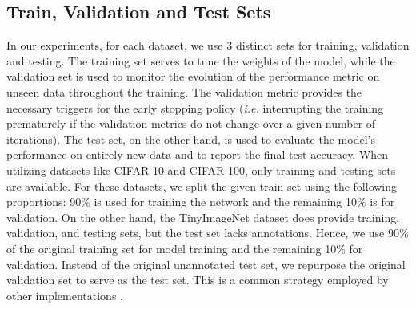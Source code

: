 \subsection{Train, Validation and Test Sets}

In our experiments, for each dataset, we use 3 distinct sets for training,
validation and testing. The training set serves to tune the weights of the
model, while the validation set is used to monitor the evolution of the
performance metric on unseen data throughout the training. The validation metric
provides the necessary triggers for the early stopping policy (\emph{i.e.}
interrupting the training prematurely if the validation metrics do not change
over a given number of iterations). The test set, on the other hand, is used to
evaluate the model's performance on entirely new data and to report the final
test accuracy. When utilizing datasets like CIFAR-10 and CIFAR-100, only
training and testing sets are available. For these datasets, we split the given
train set using the following proportions: 90\% is used for training the network
and the remaining 10\% is for validation. On the other hand, the TinyImageNet
dataset does provide training, validation, and testing sets, but the test set
lacks annotations. Hence, we use 90\% of the original training set for model
training and the remaining 10\% for validation. Instead of the original
unannotated test set, we repurpose the original validation set to serve as the
test set. This is a common strategy employed by other implementations
\cite{hanyuanxu2018tinyimagenet,nbdt,alvinwan2020nbdt}.\\
